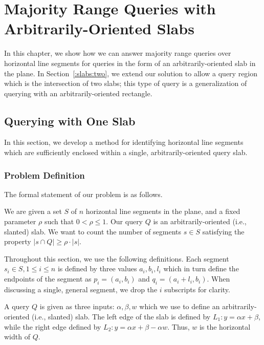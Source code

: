 \chapter{Majority Range Queries with Arbitrarily-Oriented Slabs}
\label{:slabs}

In this chapter, we show how we can answer majority range queries over horizontal line segments for queries in the form of an arbitrarily-oriented slab in the plane.  In Section~\ref{:slabs:two}, we extend our solution to allow a query region which is the intersection of two slabs; this type of query is a generalization of querying with an arbitrarily-oriented rectangle.

\section{Querying with One Slab}
\label{:slabs:one}

In this section, we develop a method for identifying horizontal line segments which are sufficiently enclosed within a single, arbitrarily-oriented query slab.


\subsection{Problem Definition}
\label{:slabs:one:problem-definition}

The formal statement of our problem is as follows.

\begin{problem}
We are given a set $S$ of $n$ horizontal line segments in the plane, and a fixed parameter $\rho$ such that $0 < \rho \leq 1$. Our query $Q$ is an arbitrarily-oriented (i.e., slanted) slab. We want to count the number of segments $s \in S$ satisfying the property $|s \cap Q| \geq \rho \cdot |s|$.
\end{problem}

Throughout this section, we use the following definitions. Each segment $s_i \in S, 1 \leq i \leq n$ is defined by three values $a_i, b_i, l_i$ which in turn define the endpoints of the segment as $p_i = (a_i, b_i)$ and $q_i = (a_i + l_i, b_i)$. When discussing a single, general segment, we drop the $i$ subscripts for clarity.

A query $Q$ is given as three inputs: $\alpha, \beta, w$ which we use to define an arbitrarily-oriented (i.e., slanted) slab. The left edge of the slab is defined by $L_1 : y = \alpha x + \beta$, while the right edge defined by $L_2: y = \alpha x + \beta - \alpha w$. Thus, $w$ is the horizontal width of $Q$.

